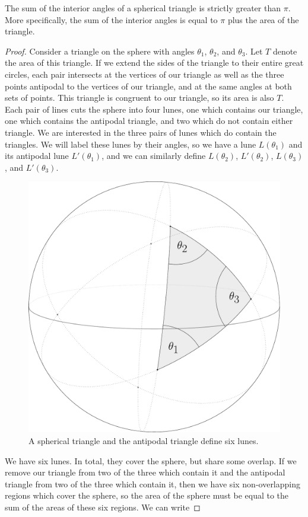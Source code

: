 \begin{lemma}\label{lem:sphtri}
	
	The sum of the interior angles of a spherical triangle is strictly greater than $\pi$.  More specifically, the sum of the interior angles is equal to $\pi$ plus the area of the triangle.
\end{lemma}

\begin{proof}
	Consider a triangle on the sphere with angles $\theta_1$, $\theta_2$, and $\theta_3$.  Let $T$ denote the area of this triangle. If we extend the sides of the triangle to their entire great circles, each pair intersects at the vertices of our triangle as well as the three points antipodal to the vertices of our triangle, and at the same angles at both sets of points.  This triangle is congruent to our triangle, so its area is also $T$.  Each pair of lines cuts the sphere into four lunes, one which contains our triangle, one which contains the antipodal triangle, and two which do not contain either triangle.  We are interested in the three pairs of lunes which do contain the triangles.  We will label these lunes by their angles, so we have a lune $L(\theta_1)$ and its antipodal lune $L'(\theta_1)$, and we can similarly define $L(\theta_2)$, $L'(\theta_2)$, $L(\theta_3)$, and $L'(\theta_3)$.
	
	
	\begin{figure}[htb]
		\centering
		\includegraphics[width=.35\textwidth]{figs/trilune.pdf}
		\caption{A spherical triangle and the antipodal triangle define six lunes.}
		\label{fig:trilune}
	\end{figure}
	
	
	We have six lunes.  In total, they cover the sphere, but share some overlap.  If we remove our triangle from two of the three which contain it and the antipodal triangle from two of the three which contain it, then we have six non-overlapping regions which cover the sphere, so the area of the sphere must be equal to the sum of the areas of these six regions.  We can write
	

\end{proof}
